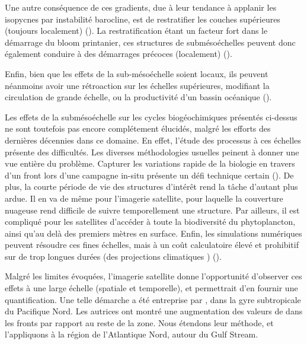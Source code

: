 Une autre conséquence de ces gradients, due à leur tendance à applanir les isopycnes par instabilité barocline, est de restratifier les couches supérieures (toujours localement) (\cite{fox-kemper_2008}).
La restratification étant un facteur fort dans le démarrage du bloom printanier, ces structures de submésoéchelles peuvent donc également conduire à des démarrages précoces (localement) (\cite{mahadevan_2020}).

Enfin, bien que les effets de la sub-mésoéchelle soient locaux, ils peuvent néanmoins avoir une rétroaction sur les échelles supérieures, modifiant la circulation de grande échelle, ou la productivité d'un bassin océanique (\cite{levy_2012a,balwada_2022}).

Les effets de la submésoéchelle sur les cycles biogéochimiques présentés ci-dessus ne sont toutefois pas encore complétement élucidés, malgré les efforts des dernières décennies dans ce domaine.
En effet, l'étude des processus à ces échelles présente des difficultés.
Les diverses méthodologies usuelles peinent à donner une vue entière du problème.
Capturer les variations rapide de la biologie en travers d'un front lors d'une campagne in-situ présente un défi technique certain (\cite{marrec_2018,tzortzis_2021}).
De plus, la courte période de vie des structures d'intérêt rend la tâche d'autant plus ardue.
Il en va de même pour l'imagerie satellite, pour laquelle la couverture nuageuse rend difficile de suivre temporellement une structure.
Par ailleurs, il est compliqué pour les satellites d'accéder à toute la biodiversité du phytoplancton, ainsi qu'au delà des premiers mètres en surface.
Enfin, les simulations numériques peuvent résoudre ces fines échelles, mais à un coût calculatoire élevé et prohibitif sur de trop longues durées (des projections climatiques ) (\cite{fox-kemper_2019}).

Malgré les limites évoquées, l'imagerie satellite donne l'opportunité d'observer ces effets à une large échelle (spatiale et temporelle), et permettrait d'en fournir une quantification.
Une telle démarche a été entreprise par \textcite{liu_2016}, dans la gyre subtropicale du Pacifique Nord.
Les autrices  ont montré une augmentation des valeurs de  dans les fronts par rapport au reste de la zone.
Nous étendons leur méthode, et l'appliquons à la région de l'Atlantique Nord, autour du Gulf Stream.

